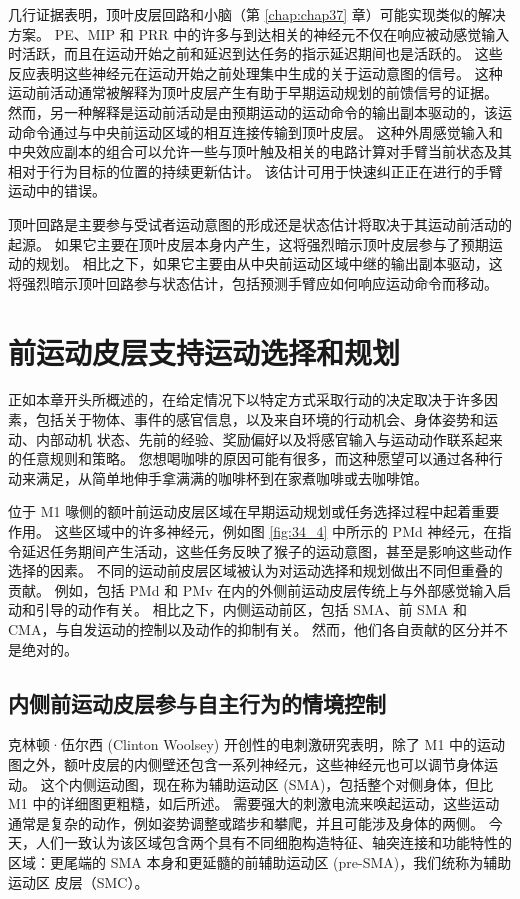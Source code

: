 几行证据表明，顶叶皮层回路和小脑（第 \ref{chap:chap37} 章）可能实现类似的解决方案。
PE、MIP 和 PRR 中的许多与到达相关的神经元不仅在响应被动感觉输入时活跃，而且在运动开始之前和延迟到达任务的指示延迟期间也是活跃的。
这些反应表明这些神经元在运动开始之前处理集中生成的关于运动意图的信号。
这种运动前活动通常被解释为顶叶皮层产生有助于早期运动规划的前馈信号的证据。
然而，另一种解释是运动前活动是由预期运动的运动命令的输出副本驱动的，该运动命令通过与中央前运动区域的相互连接传输到顶叶皮层。
这种外周感觉输入和中央效应副本的组合可以允许一些与顶叶触及相关的电路计算对手臂当前状态及其相对于行为目标的位置的持续更新估计。
该估计可用于快速纠正正在进行的手臂运动中的错误。


顶叶回路是主要参与受试者运动意图的形成还是状态估计将取决于其运动前活动的起源。
如果它主要在顶叶皮层本身内产生，这将强烈暗示顶叶皮层参与了预期运动的规划。
相比之下，如果它主要由从中央前运动区域中继的输出副本驱动，这将强烈暗示顶叶回路参与状态估计，包括预测手臂应如何响应运动命令而移动。



\section{前运动皮层支持运动选择和规划}

正如本章开头所概述的，在给定情况下以特定方式采取行动的决定取决于许多因素，包括关于物体、事件的感官信息，以及来自环境的行动机会、身体姿势和运动、内部动机 状态、先前的经验、奖励偏好以及将感官输入与运动动作联系起来的任意规则和策略。
您想喝咖啡的原因可能有很多，而这种愿望可以通过各种行动来满足，从简单地伸手拿满满的咖啡杯到在家煮咖啡或去咖啡馆。


位于 M1 喙侧的额叶前运动皮层区域在早期运动规划或任务选择过程中起着重要作用。
这些区域中的许多神经元，例如图 \ref{fig:34_4} 中所示的 PMd 神经元，在指令延迟任务期间产生活动，这些任务反映了猴子的运动意图，甚至是影响这些动作选择的因素。
不同的运动前皮层区域被认为对运动选择和规划做出不同但重叠的贡献。
例如，包括 PMd 和 PMv 在内的外侧前运动皮层传统上与外部感觉输入启动和引导的动作有关。
相比之下，内侧运动前区，包括 SMA、前 SMA 和 CMA，与自发运动的控制以及动作的抑制有关。
然而，他们各自贡献的区分并不是绝对的。



\subsection{内侧前运动皮层参与自主行为的情境控制}

克林顿·伍尔西 (Clinton Woolsey) 开创性的电刺激研究表明，除了 M1 中的运动图之外，额叶皮层的内侧壁还包含一系列神经元，这些神经元也可以调节身体运动。
这个内侧运动图，现在称为辅助运动区 (SMA)，包括整个对侧身体，但比 M1 中的详细图更粗糙，如后所述。
需要强大的刺激电流来唤起运动，这些运动通常是复杂的动作，例如姿势调整或踏步和攀爬，并且可能涉及身体的两侧。
今天，人们一致认为该区域包含两个具有不同细胞构造特征、轴突连接和功能特性的区域：更尾端的 SMA 本身和更延髓的前辅助运动区 (pre-SMA)，我们统称为辅助运动区 皮层（SMC）。



